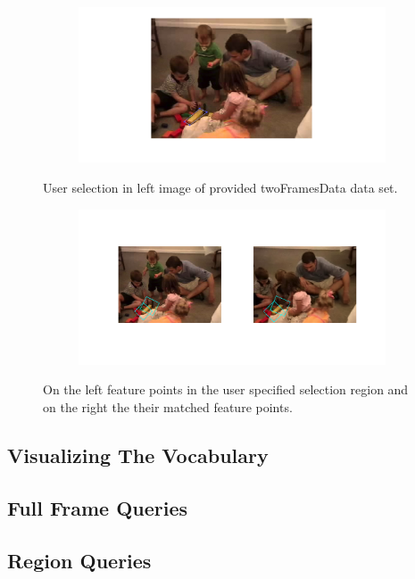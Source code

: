 \documentclass{paper}
\begin{document}
\begin{figure}[H]
\centering
\begin{subfigure}{1.0\textwidth}
\includegraphics[width=\textwidth]{figures/raw_matches/kids/selMatch2}
\end{subfigure}
\caption{User selection in left image of provided twoFramesData data set.}
\label{fig:kids2_raw_sel}
\end{figure}

\begin{figure}[H]
\centering
\begin{subfigure}{1.0\textwidth}
\includegraphics[width=\textwidth]{figures/raw_matches/kids/match2}
\end{subfigure}
\caption{On the left feature points in the user specified selection region and on the right the their matched feature points.}
\label{fig:kids_raw_matching}
\end{figure}



\subsection{Visualizing The Vocabulary}

\subsection{Full Frame Queries}

\subsection{Region Queries}
\end{document}
